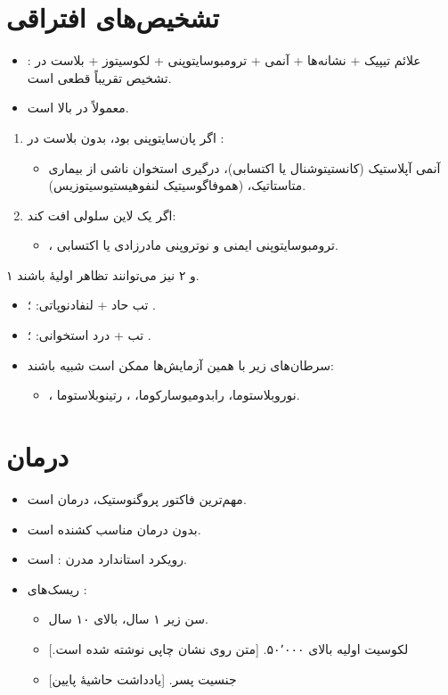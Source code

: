 \documentclass[12pt,a4paper]{article}
\begin{document}
\section*{تشخیص‌های افتراقی }
\begin{itemize}
\item علائم تیپیک + نشانه‌ها + آنمی + ترومبوسایتوپنی + لکوسیتوز + بلاست در : تشخیص تقریباً قطعی است.
\item {} معمولاً در  بالا است.
\end{itemize}
\begin{enumerate}
\item اگر پان‌سایتوپنی بود، بدون بلاست در :
\begin{itemize}
\item آنمی آپلاستیک (کانستیتوشنال یا اکتسابی)، درگیری استخوان ناشی از بیماری متاستاتیک،  (هموفاگوسیتیک لنفوهیستیوسیتوزیس).
\end{itemize}
\item اگر یک لاین سلولی افت کند:
\begin{itemize}
\item {}، ترومبوسایتوپنی ایمنی و نوتروپنی مادرزادی یا اکتسابی.
\end{itemize}
\end{enumerate}
۱ و ۲ نیز می‌توانند تظاهر اولیهٔ  باشند.
\begin{itemize}
\item تب حاد + لنفادنوپاتی: ؛ .
\item تب + درد استخوانی: ؛ .
\item سرطان‌های زیر با همین آزمایش‌ها ممکن است شبیه  باشند:
\begin{itemize}
\item {}، نوروبلاستوما، رابدومیوسارکوما، ، رتینوبلاستوما.
\end{itemize}
\end{itemize}
\section*{درمان }
\begin{itemize}
\item مهم‌ترین فاکتور پروگنوستیک، درمان  است.
\item بدون درمان مناسب  کشنده است.
\item رویکرد استاندارد مدرن :  است.
\item ریسک‌های :
\begin{itemize}
\item سن زیر ۱ سال، بالای ۱۰ سال.
\item لکوسیت اولیه بالای ۵۰٬۰۰۰. [متن روی نشان چاپی  نوشته شده است.]
\item جنسیت پسر. [یادداشت حاشیهٔ پایین]
\end{itemize}
\end{itemize}
\end{document}
